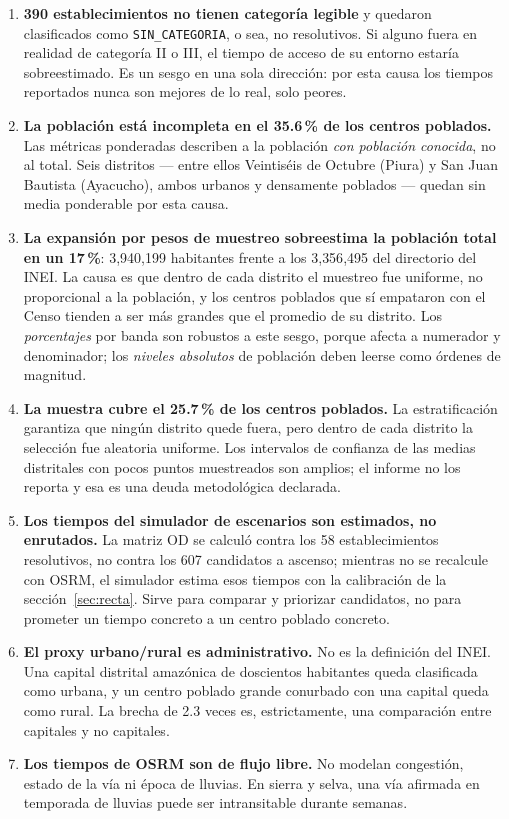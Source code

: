 \documentclass[11pt,a4paper]{article}
\begin{document}
\begin{enumerate}[leftmargin=1.4em]
\item \textbf{390 establecimientos no tienen categoría legible} y quedaron
clasificados como \texttt{SIN\_\allowbreak CATEGORIA}, o sea, no resolutivos. Si alguno
fuera en realidad de categoría II o III, el tiempo de acceso de su entorno
estaría sobreestimado. Es un sesgo en una sola dirección: por esta causa los
tiempos reportados nunca son mejores de lo real, solo peores.

\item \textbf{La población está incompleta en el 35.6\,\% de los centros
poblados.} Las métricas ponderadas describen a la población \emph{con
población conocida}, no al total. Seis distritos --- entre ellos Veintiséis de
Octubre (Piura) y San Juan Bautista (Ayacucho), ambos urbanos y densamente
poblados --- quedan sin media ponderable por esta causa.

\item \textbf{La expansión por pesos de muestreo sobreestima la población
total en un 17\,\%}: 3{,}940{,}199 habitantes frente a los 3{,}356{,}495 del
directorio del INEI. La causa es que dentro de cada distrito el muestreo fue
uniforme, no proporcional a la población, y los centros poblados que sí
empataron con el Censo tienden a ser más grandes que el promedio de su
distrito. Los \emph{porcentajes} por banda son robustos a este sesgo, porque
afecta a numerador y denominador; los \emph{niveles absolutos} de población
deben leerse como órdenes de magnitud.

\item \textbf{La muestra cubre el 25.7\,\% de los centros poblados.} La
estratificación garantiza que ningún distrito quede fuera, pero dentro de cada
distrito la selección fue aleatoria uniforme. Los intervalos de confianza de
las medias distritales con pocos puntos muestreados son amplios; el informe no
los reporta y esa es una deuda metodológica declarada.

\item \textbf{Los tiempos del simulador de escenarios son estimados, no
enrutados.} La matriz OD se calculó contra los 58 establecimientos
resolutivos, no contra los 607 candidatos a ascenso; mientras no se recalcule
con OSRM, el simulador estima esos tiempos con la calibración de la
sección~\ref{sec:recta}. Sirve para comparar y priorizar candidatos, no para
prometer un tiempo concreto a un centro poblado concreto.

\item \textbf{El proxy urbano/rural es administrativo.} No es la definición del
INEI. Una capital distrital amazónica de doscientos habitantes queda
clasificada como urbana, y un centro poblado grande conurbado con una capital
queda como rural. La brecha de 2.3 veces es, estrictamente, una comparación
entre capitales y no capitales.

\item \textbf{Los tiempos de OSRM son de flujo libre.} No modelan congestión,
estado de la vía ni época de lluvias. En sierra y selva, una vía afirmada en
temporada de lluvias puede ser intransitable durante semanas.

\end{enumerate}
\end{document}
